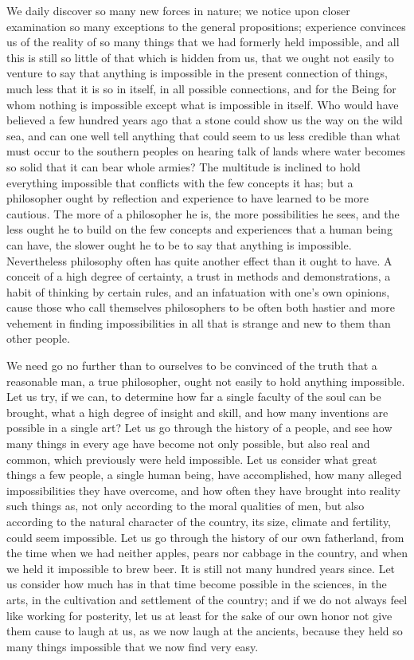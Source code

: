 \documentclass[12pt,a4paper,openany]{book}
\newcommand{\opage}[1]{\marginnote{\footnotesize\textit{[#1]}}}
\begin{document}
We daily discover so many new forces in nature; we notice upon closer examination
so many exceptions to the general propositions; experience convinces us of the
reality of so many things that we had formerly held impossible, and all this is
still so little of that which is hidden from us, that we ought not easily to
venture to say that anything is impossible in the present connection of things,
much less that it is so in itself, in all possible connections, and for the Being
for whom nothing is impossible except what is impossible in itself. Who would
have believed a few hundred years ago that a stone could show us the way on the
wild sea, and can one well tell anything that could seem to us less credible than
what must occur to the southern peoples on hearing talk of lands where water
becomes so solid that it can bear whole armies? The multitude is inclined to hold
everything impossible that conflicts with the few concepts it has; but a
philosopher ought by reflection and experience to have learned to be more
cautious. The more of a philosopher he is, the more possibilities he sees, and
the less ought he to build on the few concepts and experiences that a human being
can have, the slower ought he to be to say that anything is impossible.
Nevertheless philosophy often has quite another effect than it ought to have. A
conceit of a high degree of certainty, a trust in methods and demonstrations, a
habit of thinking by certain rules, and an infatuation with one's own opinions,
cause those who call themselves philosophers to be often both hastier and more
vehement in finding impossibilities in all that is strange and new to them than
other people.

\setcounter{footnote}{0}%
\opage{33}We need go no further than to ourselves to be convinced of the truth that a
reasonable man, a true philosopher, ought not easily to hold anything impossible.
Let us try, if we can, to determine how far a single faculty of the soul can be
brought, what a high degree of insight and skill, and how many inventions are
possible in a single art? Let us go through the history of a people, and see how
many things in every age have become not only possible, but also real and common,
which previously were held impossible. Let us consider what great things a few
people, a single human being, have accomplished, how many alleged impossibilities
they have overcome, and how often they have brought into reality such things as,
not only according to the moral qualities of men, but also according to the
natural character of the country, its size, climate and fertility, could seem
impossible. Let us go through the history of our own fatherland, from the time
when we had neither apples, pears nor cabbage in the country, and when we held it
impossible to brew beer. It is still not many hundred years since. Let us
consider how much has in that time become possible in the sciences, in the arts,
in the cultivation and settlement of the country; and if we do not always feel
like working for posterity, let us at least for the sake of our own honor not give
them cause to laugh at us, as we now laugh at the ancients, because they held so
many things impossible that we now find very easy.
\end{document}
